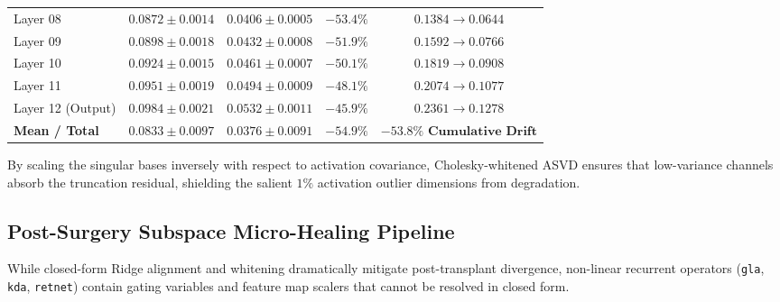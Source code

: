 \begin{table}[h]
\begin{tabular}{l c c c c}
Layer 08            & $0.0872 \pm 0.0014$ & $\mathbf{0.0406 \pm 0.0005}$ & $-53.4\%$ & $0.1384 \to 0.0644$ \\
Layer 09            & $0.0898 \pm 0.0018$ & $\mathbf{0.0432 \pm 0.0008}$ & $-51.9\%$ & $0.1592 \to 0.0766$ \\
Layer 10            & $0.0924 \pm 0.0015$ & $\mathbf{0.0461 \pm 0.0007}$ & $-50.1\%$ & $0.1819 \to 0.0908$ \\
Layer 11            & $0.0951 \pm 0.0019$ & $\mathbf{0.0494 \pm 0.0009}$ & $-48.1\%$ & $0.2074 \to 0.1077$ \\
Layer 12 (Output)   & $0.0984 \pm 0.0021$ & $\mathbf{0.0532 \pm 0.0011}$ & $-45.9\%$ & $0.2361 \to 0.1278$ \\
\midrule
\textbf{Mean / Total}& $\mathbf{0.0833 \pm 0.0097}$ & $\mathbf{0.0376 \pm 0.0091}$ & $\mathbf{-54.9\%}$ & $\mathbf{-53.8\%\text{ Cumulative Drift}}$ \\
\bottomrule
\end{tabular}
\end{table}

By scaling the singular bases inversely with respect to activation covariance, Cholesky-whitened ASVD ensures that low-variance channels absorb the truncation residual, shielding the salient $1\%$ activation outlier dimensions from degradation.

\subsection{Post-Surgery Subspace Micro-Healing Pipeline}
\label{sec:surgery_micro_healing}

While closed-form Ridge alignment and whitening dramatically mitigate post-transplant divergence, non-linear recurrent operators (\texttt{gla}, \texttt{kda}, \texttt{retnet}) contain gating variables and feature map scalers that cannot be resolved in closed form. 

